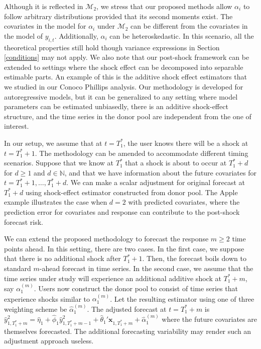 \documentclass[11pt,3p,review,authoryear]{elsarticle}
\def\mc#1{\mathcal{#1}} %
\theoremstyle{definition}
\begin{document}
Although it is reflected in $\mc{M}_2$, we stress that our proposed methods allow $\alpha_i$ to follow arbitrary distributions provided that its second moments exist. The covariates in the model for $\alpha_i$ under $\mc{M}_2$ can be different from the covariates in the model of $y_{i,t}$.  Additionally, $\alpha_i$ can be heteroskedastic. In this scenario, all the theoretical properties still hold though variance expressions in Section \ref{conditions} may not apply. We also note that our post-shock framework can be extended to settings where the shock effect can be decomposed into separable estimable parts. An example of this is the additive shock effect estimators that we studied in our Conoco Phillips analysis. Our methodology is developed for autoregressive models, but it can be generalized to any setting  where model parameters can be estimated unbiasedly, there is an additive shock-effect structure, and the time series in the donor pool are independent from the one of interest.

In our setup, we assume that at $t=T_1^*$, the user knows there will be a shock at $t=T_1^*+1$. The methodology can be amended to accommodate different timing scenarios. Suppose that we know at $T_1^*$ that a shock is about to occur at $T_1^* + d$ for $d\geq 1$ and $d\in \mathbb{N}$, and that we have information about the future covariates for $t = T_1^* +1 , \ldots, T_1^* + d$. We can make a scalar adjustment for original forecast at $T_1^*+d$ using shock-effect estimator constructed from donor pool. The Apple example illustrates the case when $d = 2$ with predicted covariates, where the prediction error for covariates and response can contribute to the post-shock forecast risk.


We can extend the proposed methodology to forecast the response $m\geq 2$ time points ahead. In this setting, there are two cases. In the first case, we suppose that there is no additional shock after $T_1^*+1$. Then, the forecast boils down to standard $m$-ahead forecast in time series. In the second case, we assume that the time series under study will experience an additional additive shock at $T_1^* + m$, say $\alpha_1^{(m)}$. Users now construct the donor pool to consist of time series that experience shocks similar to  $\alpha_1^{(m)}$. Let the resulting estimator using one of  three weighting scheme be $\hat{\alpha}_1^{(m)}$.  The adjusted forecast at $t = T_1^* + m$ is
$
  \hat{y}^2_{1, T_1^*+m}=\hat{\eta}_1 + \hat{\phi}_1 \hat{y}_{1, T_1^* + m - 1}^2 + \hat{\theta}_1' \mathbf{x}_{1, T_1^* +m} + \hat{\alpha}_1^{(m)}
$
where the future covariates are themselves forecasted. The additional forecasting variability may  render such an adjustment approach useless.
\end{document}
